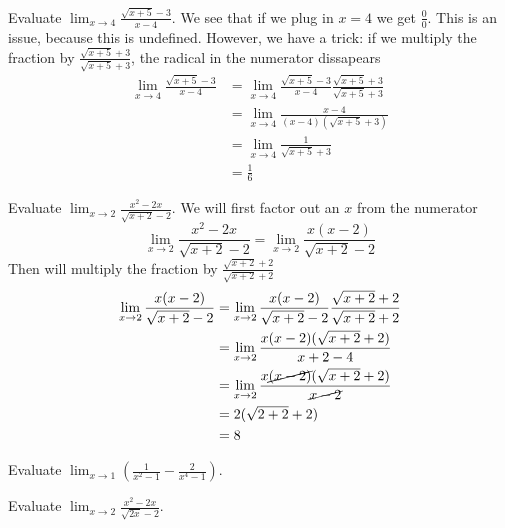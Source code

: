 \documentclass[working]{tuftebook}
\begin{document}
\newpage 
\begin{fullwidth}
\begin{eg}
    Evaluate $\displaystyle \lim_{x\to 4} \frac{ \sqrt{x+5}-3}{x-4}$. We see that if we plug in $x=4$ we get $ \frac{0}{0}$. This is an issue, because this is undefined. However, we have a trick: if we multiply the fraction by $\displaystyle \frac{ \sqrt{x+5}+3}{ \sqrt{x+5}+3}$, the radical in the numerator dissapears 
    \begin{align*}
        \lim_{x\to 4} \frac{ \sqrt{x+5}-3}{x-4}&= \lim_{x\to 4} \frac{ \sqrt{x+5}-3}{x-4} \frac{ \sqrt{x+5}+3}{ \sqrt{x+5}+3}\\ 
                                               &= \lim_{x\to 4} \frac{x-4}{(x-4)( \sqrt{x+5}+3)}\\ 
                                               &= \lim_{x\to 4} \frac{1}{ \sqrt{x+5}+3}\\ 
                                               &= \frac{1}{6}
    \end{align*}
\end{eg}
\begin{eg}
    Evaluate $\displaystyle \lim_{x\to 2} \frac{x^2-2x}{ \sqrt{x+2}-2}$. We will first factor out an $x$ from the numerator
    \[
        \lim_{x\to 2} \frac{x^2-2x}{ \sqrt{x+2}-2}= \lim_{x\to 2} \frac{x(x-2)}{ \sqrt{x+2}-2}
    \]
Then will multiply the fraction by $\displaystyle \frac{ \sqrt{x+2}+2}{ \sqrt{x+2}+2}$ 
    \begin{align*}
        \lim_{x\to 2} \frac{x(x-2)}{ \sqrt{x+2}-2}&= \lim_{x\to 2} \frac{x(x-2)}{ \sqrt{x+2}-2} \frac{ \sqrt{x+2}+2}{ \sqrt{x+2}+2}\\ 
                                                  &= \lim_{x\to 2} \frac{x(x-2)( \sqrt{x+2}+2)}{x+2-4}\\ 
                                                  &= \lim_{x\to 2} \frac{x\cancel{(x-2)}( \sqrt{x+2}+2)}{\cancel{x-2}}\\
                                                  &= 2( \sqrt{2+2}+2)\\ 
                                                  &= 8
    \end{align*}
\end{eg}
\end{fullwidth}
\newpage
\begin{problems}
    \item{Evaluate $\displaystyle \lim_{x\to 1} \left( \frac{1}{x^2-1}- \frac{2}{x^4-1} \right)$.}
    \item{Evaluate $\displaystyle \lim_{x\to 2} \frac{x^2-2x}{ \sqrt{2x}-2}$.}
\end{problems}
\end{document}
